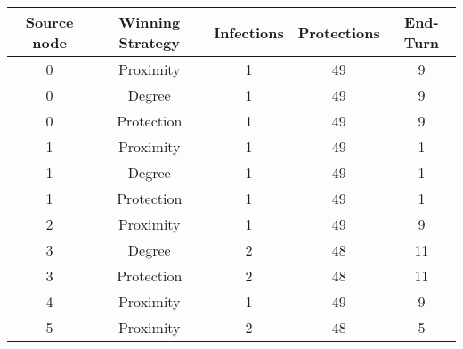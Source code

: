 \documentclass[results.tex]{subfiles}
\begin{document}
    \begin{center}
        \begin{tabular}{| c || c | c | c | c |}
            \hline
            {\bfseries Source node} & {\bfseries Winning Strategy} & {\bfseries Infections} & {\bfseries Protections}
            & {\bfseries End-Turn}
            \\  %
            \hline\hline
            0                       & Proximity                    & 1                      & 49                      & 9                    \\
            \hline
            0                       & Degree                       & 1                      & 49                      & 9                    \\
            \hline
            0                       & Protection                   & 1                      & 49                      & 9                    \\
            \hline
            1                       & Proximity                    & 1                      & 49                      & 1                    \\
            \hline
            1                       & Degree                       & 1                      & 49                      & 1                    \\
            \hline
            1                       & Protection                   & 1                      & 49                      & 1                    \\
            \hline
            2                       & Proximity                    & 1                      & 49                      & 9                    \\
            \hline
            3                       & Degree                       & 2                      & 48                      & 11                   \\
            \hline
            3                       & Protection                   & 2                      & 48                      & 11                   \\
            \hline
            4                       & Proximity                    & 1                      & 49                      & 9                    \\
            \hline
            5                       & Proximity                    & 2                      & 48                      & 5                    \\

\end{tabular}
\end{center}
\end{document}
